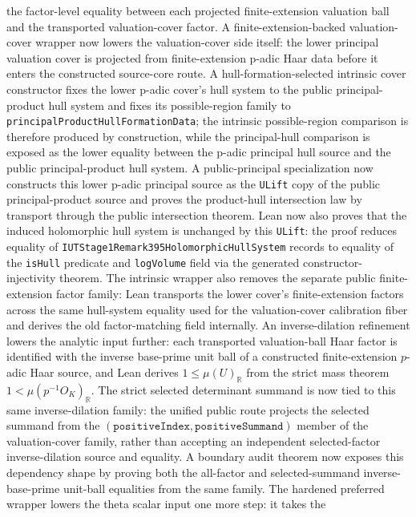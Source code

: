 \documentclass[11pt]{article}
\theoremstyle{plain}
\theoremstyle{definition}
\theoremstyle{remark}
\begin{document}
the factor-level equality between each projected finite-extension valuation
ball and the transported valuation-cover factor.  A finite-extension-backed
valuation-cover wrapper now lowers the valuation-cover side itself: the lower
principal valuation cover is projected from finite-extension p-adic Haar data
before it enters the constructed source-core route.  A hull-formation-selected
intrinsic cover constructor fixes the lower p-adic cover's hull system to the
public principal-product hull system and fixes its possible-region family to
\texttt{principalProductHullFormationData}; the intrinsic possible-region
comparison is therefore produced by construction, while the principal-hull
comparison is exposed as the lower equality between the p-adic principal hull
source and the public principal-product hull system.  A public-principal
specialization now constructs this lower p-adic principal source as the
\texttt{ULift} copy of the public principal-product source and proves the
product-hull intersection law by transport through the public intersection
theorem.  Lean now also proves that the induced holomorphic hull system is
unchanged by this \texttt{ULift}: the proof reduces equality of
\texttt{IUTStage1Remark395HolomorphicHullSystem} records to equality of the
\texttt{isHull} predicate and \texttt{logVolume} field via the generated
constructor-injectivity theorem.  The intrinsic wrapper also
removes the separate public finite-extension factor family: Lean transports the
lower cover's finite-extension factors across the same hull-system equality used
for the valuation-cover calibration fiber and derives the old factor-matching
field internally.
An inverse-dilation refinement lowers the analytic input further: each
transported valuation-ball Haar factor is identified with the inverse
base-prime unit ball of a constructed finite-extension \(p\)-adic Haar
source, and Lean derives \(1 \leq \mu(U)_{\mathbb{R}}\) from the strict mass
theorem \(1 < \mu(p^{-1}O_K)_{\mathbb{R}}\).  The strict selected
determinant summand is now tied to this same inverse-dilation family: the
unified public route projects the selected summand from the
\((\texttt{positiveIndex},\texttt{positiveSummand})\) member of the
valuation-cover family, rather than accepting an independent selected-factor
inverse-dilation source and equality.  A boundary audit theorem now exposes
this dependency shape by proving both the all-factor and selected-summand
inverse-base-prime unit-ball equalities from the same family.  The hardened
preferred wrapper lowers the theta scalar input one more step: it takes the
\end{document}
